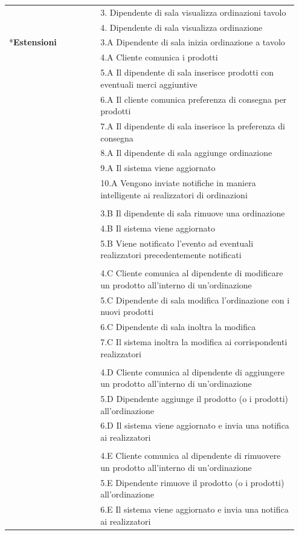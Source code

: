 \begin{longtable}[htbp]{|p{0.3\linewidth}|p{0.65\linewidth}|}
	& 3. Dipendente di sala visualizza ordinazioni tavolo \\
	& 4. Dipendente di sala visualizza ordinazione\\
	\hline
	\newpage
	\multirow{28}*{\textbf{Estensioni}}
	& 3.A Dipendente di sala inizia ordinazione a tavolo \\
	& 4.A Cliente comunica i prodotti \\
	& 5.A Il dipendente di sala inserisce prodotti con eventuali merci aggiuntive \\
	& 6.A Il cliente comunica preferenza di consegna per prodotti \\
	& 7.A Il dipendente di sala inserisce la preferenza di consegna \\
	& 8.A Il dipendente di sala aggiunge ordinazione \\
	& 9.A Il sistema viene aggiornato \\
	& 10.A Vengono inviate notifiche in maniera  intelligente ai realizzatori di ordinazioni \\
	& \\
	& 3.B Il dipendente di sala rimuove una ordinazione \\
	& 4.B Il sistema viene aggiornato \\
	& 5.B Viene notificato l’evento ad eventuali realizzatori precedentemente notificati \\
	& \\
	& 4.C Cliente comunica al dipendente di modificare un prodotto all'interno di un'ordinazione \\
	& 5.C Dipendente di sala modifica l'ordinazione con i nuovi prodotti \\
	& 6.C Dipendente di sala inoltra la modifica \\
	& 7.C Il sistema inoltra la modifica ai corrispondenti realizzatori \\
	
	& \\
	& 4.D Cliente comunica al dipendente di aggiungere un prodotto all'interno di un'ordinazione \\
	& 5.D Dipendente aggiunge il prodotto (o i prodotti) all'ordinazione \\
	& 6.D Il sistema viene aggiornato e invia una notifica ai realizzatori \\
	
	& \\
	& 4.E Cliente comunica al dipendente di rimuovere un prodotto all'interno di un'ordinazione \\
	& 5.E Dipendente rimuove il prodotto (o i prodotti) all'ordinazione \\
	& 6.E Il sistema viene aggiornato e invia una notifica ai realizzatori \\
	

\end{longtable}
